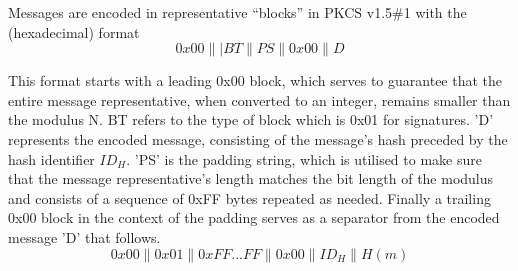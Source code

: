 \documentclass[]{final_report}
\theoremstyle{definition}
\begin{document}
Messages are encoded in representative “blocks” in PKCS v1.5\#1 with the (hexadecimal) format
\[0x00\||BT\|PS\|0x00\|D\]

This format starts with a leading 0x00 block, which serves to guarantee that the entire message representative, when converted to an integer, remains smaller than the modulus N. BT refers to the type of block which is 0x01 for signatures. 'D' represents the encoded message, consisting of the message's hash preceded by the hash identifier $ID_{H}$. 'PS' is the padding string, which is utilised to make sure that the message representative's length matches the bit length of the modulus and consists of a sequence of 0xFF bytes repeated as needed. Finally a trailing 0x00 block in the context of the padding serves as a separator from the encoded message 'D' that follows.
\[0x00\|0x01\|0xFF . . . FF\|0x00\|ID_{H}\|H(m)\]
\end{document}
